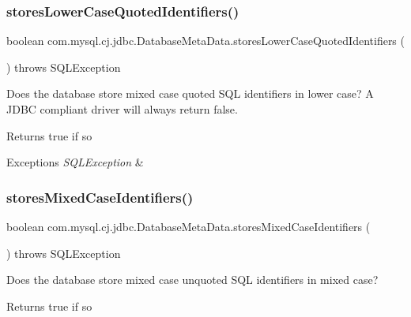 \subsubsection{\texorpdfstring{stores\+Lower\+Case\+Quoted\+Identifiers()}{storesLowerCaseQuotedIdentifiers()}}
{\footnotesize\ttfamily boolean com.\+mysql.\+cj.\+jdbc.\+Database\+Meta\+Data.\+stores\+Lower\+Case\+Quoted\+Identifiers (\begin{DoxyParamCaption}{ }\end{DoxyParamCaption}) throws S\+Q\+L\+Exception}

Does the database store mixed case quoted S\+QL identifiers in lower case? A J\+D\+BC compliant driver will always return false.

\begin{DoxyReturn}{Returns}
true if so 
\end{DoxyReturn}

\begin{DoxyExceptions}{Exceptions}
{\em S\+Q\+L\+Exception} & \\
\hline
\end{DoxyExceptions}
\mbox{\label{classcom_1_1mysql_1_1cj_1_1jdbc_1_1_database_meta_data_a742819e579d84cb1ade3dcadb16471ba}} 
\subsubsection{\texorpdfstring{stores\+Mixed\+Case\+Identifiers()}{storesMixedCaseIdentifiers()}}
{\footnotesize\ttfamily boolean com.\+mysql.\+cj.\+jdbc.\+Database\+Meta\+Data.\+stores\+Mixed\+Case\+Identifiers (\begin{DoxyParamCaption}{ }\end{DoxyParamCaption}) throws S\+Q\+L\+Exception}

Does the database store mixed case unquoted S\+QL identifiers in mixed case?

\begin{DoxyReturn}{Returns}
true if so 
\end{DoxyReturn}

